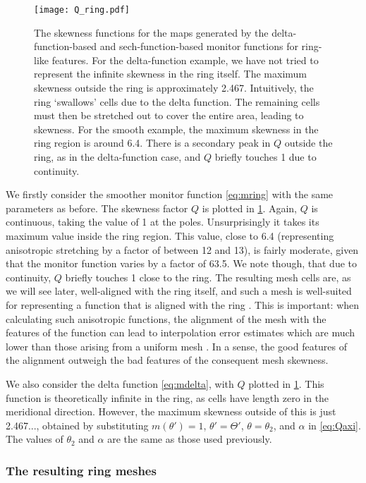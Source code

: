 \documentclass[11pt, a4paper]{scrartcl}  %
\theoremstyle{plain}
\theoremstyle{definition}
\numberwithin{equation}{section}
\begin{document}
\begin{figure}[!tb]
  \centering
  \texttt{[image: Q\_ring.pdf]}
  \caption{The skewness functions for the maps generated by the
delta-function-based and sech-function-based monitor functions for
ring-like features. For the delta-function example, we have not tried to
represent the infinite skewness in the ring itself. The maximum skewness
outside the ring is approximately 2.467. Intuitively, the ring
`swallows' cells due to the delta function. The remaining cells must
then be stretched out to cover the entire area, leading to skewness. For
the smooth example, the maximum skewness in the ring region is around
6.4. There is a secondary peak in $Q$ outside the ring, as in the
delta-function case, and $Q$ briefly touches 1 due to continuity.}
\label{fig:Q_ring}
\end{figure}

We firstly consider the smoother monitor function \cref{eq:mring}
with the same parameters as before. The skewness factor $Q$ is plotted
in \cref{fig:Q_ring}. Again, $Q$ is continuous, taking the value of 1 at
the poles. Unsurprisingly it takes its maximum value inside the ring
region. This value, close to 6.4 (representing anisotropic stretching by
a factor of between 12 and 13), is fairly moderate, given that the
monitor function varies by a factor of 63.5. We note though, that due to
continuity, $Q$ briefly touches 1 close to the ring. The resulting mesh
cells are, as we will see later,
well-aligned with the ring itself, and such a mesh is well-suited for
representing a function that is aligned with the ring
\citep{huang2011adaptive,budd2018inprep}. This is important: when
calculating such anisotropic functions, the alignment of the mesh with
the features of the function can lead to interpolation error estimates
which are much lower than those arising from a uniform mesh
\citep{huang2011adaptive}. In a sense, the good features of the
alignment outweigh the bad features of the consequent mesh skewness.

We also consider the delta function \cref{eq:mdelta}, with $Q$ plotted
in \cref{fig:Q_ring}. This function is theoretically infinite in the
ring, as cells have length zero in the meridional direction. However,
the maximum skewness outside of this is just 2.467..., obtained by
substituting $m(\theta') = 1$, $\theta' = \Theta'$, $\theta = \theta_2$,
and $\alpha$ in \cref{eq:Qaxi}. The values of $\theta_2$ and $\alpha$
are the same as those used previously.

\subsubsection{The resulting ring meshes}
\end{document}
